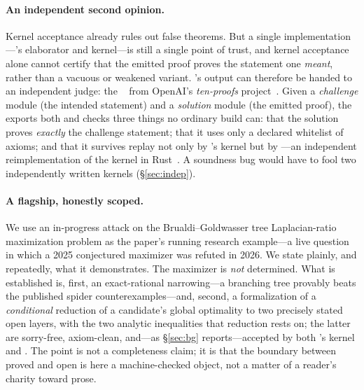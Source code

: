 \paragraph{An independent second opinion.} Kernel acceptance already rules out
false theorems. But a single implementation---\Lean's elaborator and kernel---is
still a single point of trust, and kernel acceptance alone cannot certify that the
emitted proof proves the statement one \emph{meant}, rather than a vacuous or
weakened variant. \Telperion's output can therefore be handed to an independent
judge: the \Comparator~\cite{comparator} from OpenAI's \emph{ten-proofs}
project~\cite{tenproofs}. Given a \emph{challenge} module (the intended statement)
and a \emph{solution} module (the emitted proof), the \Comparator{} exports both
and checks three things no ordinary build can: that the solution proves
\emph{exactly} the challenge statement; that it uses only a declared whitelist of
axioms; and that it survives replay not only by \Lean's kernel but by \nanoda---an
independent reimplementation of the kernel in Rust~\cite{nanoda}. A soundness bug
would have to fool two independently written kernels (\S\ref{sec:indep}).

\paragraph{A flagship, honestly scoped.} We use an in-progress attack on the
Brualdi--Goldwasser tree Laplacian-ratio maximization problem as the paper's running
research example---a live question in which a 2025 conjectured maximizer was refuted
in 2026. We state plainly, and repeatedly, what it demonstrates. The maximizer is
\emph{not} determined. What is established is, first, an exact-rational narrowing---a
branching tree provably beats the published spider counterexamples---and, second, a
\Lean{} formalization of a \emph{conditional} reduction of a candidate's global
optimality to two precisely stated open layers, with the two analytic inequalities
that reduction rests on; the latter are sorry-free, axiom-clean, and---as
\S\ref{sec:bg} reports---accepted by both \Lean's kernel and \nanoda. The point is
not a completeness claim; it is that the boundary between proved and open is here a
machine-checked object, not a matter of a reader's charity toward prose.

